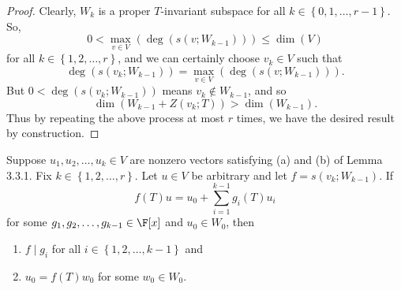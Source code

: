 \documentclass[linearalgebraII]{subfiles}
\begin{document}
    \begin{proof}
        Clearly, $W_k$ is a proper $T$-invariant subspace for all $k\in \left\lbrace 0,1,\ldots,r-1 \right\rbrace$. So,
        \begin{equation*}
            0 < \max_{v\in V}\left( \deg\left( s\left( v;W_{k-1} \right)  \right)  \right) \leq \dim(V)
        \end{equation*}
        for all $k\in\left\lbrace 1,2,\ldots,r \right\rbrace$, and we can certainly choose $v_k\in V$ such that
        \begin{equation*}
            \deg\left( s\left( v_k;W_{k-1} \right)  \right) = \max_{v\in V} \left( \deg\left( s(v;W_{k-1}) \right)  \right) .
        \end{equation*}
        But $0<\deg\left( s(v_k;W_{k-1}) \right) $ means $v_k\notin W_{k-1}$, and so
        \begin{equation*}
            \dim\left( W_{k-1}+Z(v_k;T) \right) > \dim(W_{k-1}).
        \end{equation*}
        Thus by repeating the above process at most $r$ times, we have the desired result by construction.
    \end{proof}

    \begin{lemma_inside}{}
        Suppose $u_1,u_2,\ldots,u_k\in V$ are nonzero vectors satisfying (a) and (b) of Lemma 3.3.1. Fix $k\in \left\lbrace 1,2,\ldots,r \right\rbrace$. Let $u\in V$ be arbitrary and let $f=s(v_k;W_{k-1})$. If
        \begin{equation*}
            f(T)u = u_0 + \sum^{k-1}_{i=1} g_i(T)u_i
        \end{equation*}
        for some $g_1,g_2,\ldots,g_{k-1}\in\F[x]$ and $u_0\in W_0$, then
        \begin{enumerate}
            \item $f\mid g_i$ for all $i\in\left\lbrace 1,2,\ldots,k-1 \right\rbrace$ and
            \item $u_0=f(T)w_0$ for some $w_0\in W_0$.
        \end{enumerate}
    \end{lemma_inside}
\end{document}
